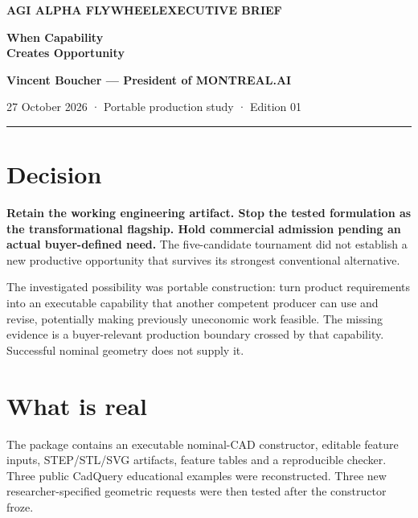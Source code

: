 \documentclass[10pt,letterpaper]{article}
\begin{document}
\thispagestyle{empty}
{\sffamily\color{AlphaPurple}\small\bfseries AGI ALPHA FLYWHEEL\hfill EXECUTIVE BRIEF\par}
\vspace{13pt}
{\sffamily\color{AlphaInk}\fontsize{27}{31}\selectfont\bfseries When Capability\\Creates Opportunity\par}
\vspace{10pt}
{\sffamily\small\bfseries Vincent Boucher — President of MONTREAL.AI\par}
{\sffamily\small\color{AlphaMuted}27 October 2026 · Portable production study · Edition 01\par}
\vspace{9pt}\textcolor{AlphaPurple}{\rule{\linewidth}{1pt}}

\color{AlphaInk}

\hypertarget{decision}{%
\section{Decision}\label{decision}}

\textbf{Retain the working engineering artifact. Stop the tested formulation as the transformational flagship. Hold commercial admission pending an actual buyer-defined need.} The five-candidate tournament did not establish a new productive opportunity that survives its strongest conventional alternative.

The investigated possibility was portable construction: turn product requirements into an executable capability that another competent producer can use and revise, potentially making previously uneconomic work feasible. The missing evidence is a buyer-relevant production boundary crossed by that capability. Successful nominal geometry does not supply it.

\hypertarget{what-is-real}{%
\section{What is real}\label{what-is-real}}

The package contains an executable nominal-CAD constructor, editable feature inputs, STEP/STL/SVG artifacts, feature tables and a reproducible checker. Three public CadQuery educational examples were reconstructed. Three new researcher-specified geometric requests were then tested after the constructor froze.
\end{document}
